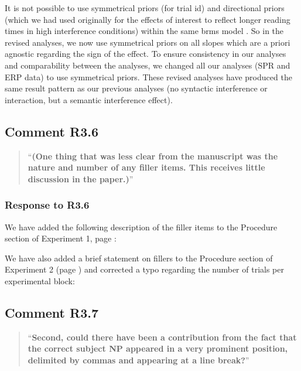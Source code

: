 \documentclass[12pt]{article}
\begin{document}
It is not possible to use symmetrical priors (for trial id) and directional priors (which we had used originally for the effects of interest to reflect longer reading times in high interference conditions) within the same brms model \citep{brms}. So in the revised analyses, we now use symmetrical priors on all slopes which are a priori agnostic regarding the sign of the effect. To ensure consistency in our analyses and comparability between the analyses, we changed all our analyses (SPR and ERP data) to use symmetrical priors. These revised analyses have produced the same result pattern as our previous analyses (no syntactic interference or interaction, but a semantic interference effect).

\subsection*{Comment R3.6}
\begin{quote}
``\textbf{(One thing that was less clear from the manuscript was the nature and number of any filler items. This receives little discussion in the paper.)}''
\end{quote}


\subsubsection*{Response to R3.6}
We have added the following description of the filler items to the Procedure section of Experiment 1, page \pageref{fillers1}:

\begin{quote}
\end{quote}

\noindent We have also added a brief statement on fillers to the Procedure section of Experiment 2 (page \pageref{fillers2}) and corrected a typo regarding the number of trials per experimental block:

\begin{quote}
\end{quote}

\subsection*{Comment R3.7}
\begin{quote}
``\textbf{Second, could there have been a contribution from the fact that the correct subject NP appeared in a very prominent position, delimited by commas and appearing at a line break?}''
\end{quote}
\end{document}

